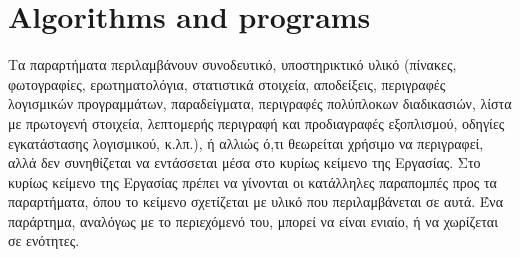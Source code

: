 
 
\chapter{Algorithms and programs \label{appendixB}}

Τα παραρτήματα περιλαμβάνουν συνοδευτικό, υποστηρικτικό υλικό (πίνακες, φωτογραφίες, ερωτηματολόγια, στατιστικά στοιχεία, αποδείξεις, περιγραφές  λογισμικών  προγραμμάτων,  παραδείγματα,  περιγραφές 
πολύπλοκων διαδικασιών, λίστα με πρωτογενή στοιχεία, λεπτομερής περιγραφή και προδιαγραφές εξοπλισμού, οδηγίες εγκατάστασης λογισμικού, κ.λπ.), ή αλλιώς ό,τι θεωρείται χρήσιμο να περιγραφεί, αλλά δεν συνηθίζεται να 
εντάσσεται μέσα στο κυρίως κείμενο της Εργασίας.  Στο κυρίως κείμενο της Εργασίας πρέπει να γίνονται οι κατάλληλες παραπομπές προς τα παραρτήματα, όπου το κείμενο σχετίζεται με υλικό που περιλαμβάνεται σε αυτά. Ένα παράρτημα, αναλόγως με το περιεχόμενό του, μπορεί να είναι ενιαίο, ή να χωρίζεται σε ενότητες.